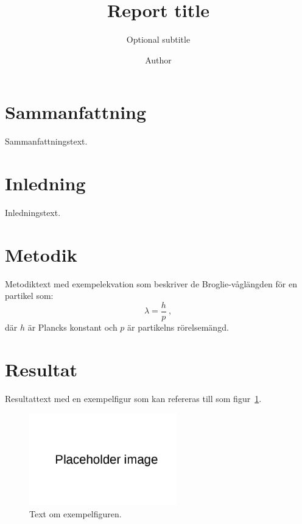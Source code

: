 \documentclass{aplreport}
\title{Report title}
\subtitle{Optional subtitle}
\author{Author}
\begin{document}
\maketitlepages



\section{Sammanfattning}
\label{sec:summary}

Sammanfattningstext.

\section{Inledning}
\label{sec:introduction}

Inledningstext.

\section{Metodik}
\label{sec:method}

Metodiktext med exempelekvation som beskriver de Broglie-våglängden för en partikel som:
%
\begin{equation}
  \lambda = \frac{h}{p}~,
  \label{eq:wavelength}
\end{equation}
%
där $h$ är Plancks konstant och $p$ är partikelns rörelsemängd.

\section{Resultat}
\label{sec:results}

Resultattext med en exempelfigur som kan refereras till som figur~\ref{fig:placeholderfigure}.

\begin{figure}[htb]
  \centering
  \includegraphics[height=4.0cm]{base_figures/placeholder.png}
  \caption{Text om exempelfiguren.}
  \label{fig:placeholderfigure}
\end{figure}
\end{document}
